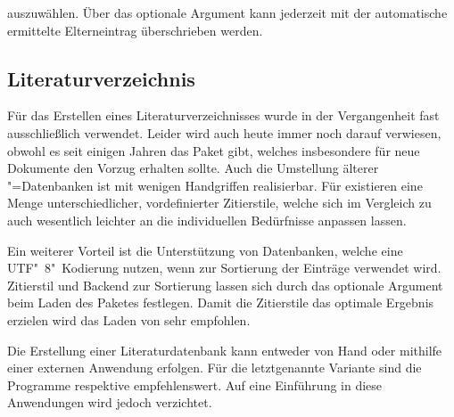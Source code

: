 \documentclass[%
  english,ngerman,%
  cdgeometry=no,DIV=12,automark,%
]{tudscrartcl}
\begin{document}
auszuwählen. Über das optionale Argument kann jederzeit mit 
 der automatische ermittelte 
Elterneintrag überschrieben werden.
%
\begin{Hint}
\newcommand*\symbollettergroup{}
\newcommand*{\newsymbol}[5][]{%
  \ifisgreeksymbol{#4}{%
    \renewcommand*{\symbollettergroup}{greekletters}%
  }{%
    \renewcommand*{\symbollettergroup}{romanletters}%
  }%
  \newglossaryentry{#2}{%
    type=symbols,%
    name={#3},%
    description={\nopostdesc},%
    symbol={\ensuremath{#4}},%
    user1={\ensuremath{\mathrm{#5}}},%
    sort={#2},%
    parent={\symbollettergroup},%
    #1%
  }%
}
\end{Hint}


\subsection{Literaturverzeichnis}
\label{sec:biblatex}%
%
Für das Erstellen eines Literaturverzeichnisses wurde in der Vergangenheit fast 
ausschließlich  verwendet. Leider wird auch heute immer noch 
darauf verwiesen, obwohl es seit einigen Jahren das Paket  
gibt, welches insbesondere für neue Dokumente den Vorzug erhalten sollte. Auch 
die Umstellung älterer "=Datenbanken ist mit wenigen Handgriffen 
realisierbar. Für  existieren eine Menge unterschiedlicher, 
vordefinierter Zitierstile, welche sich im Vergleich zu  auch 
wesentlich leichter an die individuellen Bedürfnisse anpassen lassen.

Ein weiterer Vorteil ist die Unterstützung von Datenbanken, welche eine 
UTF"~8"~Kodierung nutzen, wenn  zur Sortierung der Einträge 
verwendet wird. Zitierstil und Backend zur Sortierung lassen sich durch das 
optionale Argument beim Laden des Paketes festlegen. Damit die Zitierstile das 
optimale Ergebnis erzielen wird das Laden von  sehr empfohlen.
%
\begin{Preamble}
\usepackage{csquotes}
\usepackage[backend=biber,style=alphabetic]{biblatex}

\end{Preamble}
%
Die Erstellung einer Literaturdatenbank kann entweder von Hand oder mithilfe 
einer externen Anwendung erfolgen. Für die letztgenannte Variante sind die 
Programme  respektive  empfehlenswert. 
Auf eine Einführung in diese Anwendungen wird jedoch verzichtet. 
\end{document}
